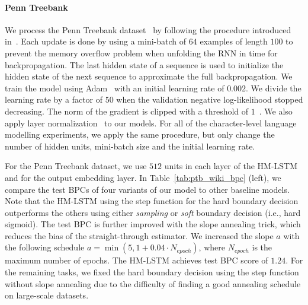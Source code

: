 \documentclass{article} %
\begin{document}
\paragraph{Penn Treebank}
We process the Penn Treebank dataset~\citep{marcus1993building} by following the procedure introduced in~\citet{mikolov2012subword}. 
Each update is done by using a mini-batch of $64$ examples of length $100$ to prevent the memory overflow problem when 
unfolding the RNN in time for backpropagation. 
The last hidden state of a sequence is used to initialize the hidden state of the next sequence to approximate the full backpropagation. 
We train the model using Adam~\citep{kingma2014adam} with an initial learning rate of $0.002$.
We divide the learning rate by a factor of $50$ when the validation negative log-likelihood stopped decreasing.
The norm of the gradient is clipped with a threshold of $1$~\citep{mikolov2010recurrent,pascanu2012difficulty}.
We also apply layer normalization~\citep{ba2016layer} to our models.
For all of the character-level language modelling experiments, we apply the same procedure, 
but only change the number of hidden units, mini-batch size and the initial learning rate.

For the Penn Treebank dataset, we use $512$ units in each layer of the HM-LSTM and for the output embedding layer.
In Table~\ref{tab:ptb_wiki_bpc} (left), we compare the test BPCs of four variants of our model to other baseline models. 
Note that the HM-LSTM using the step function for the hard boundary decision outperforms the others using either {\it sampling}
or {\it soft} boundary decision (i.e., hard sigmoid). 
The test BPC is further improved with the slope annealing trick, which reduces the bias of the straight-through estimator. 
We increased the slope $a$ with the following schedule {\small $a=\min\left(5, 1+0.04\cdot N_{epoch}\right)$},
where $N_{epoch}$ is the maximum number of epochs. 
The HM-LSTM achieves test BPC score of $1.24$.
For the remaining tasks, we fixed the hard boundary decision using the step function 
without slope annealing due to the difficulty of finding a good annealing schedule on large-scale datasets.
\end{document}
